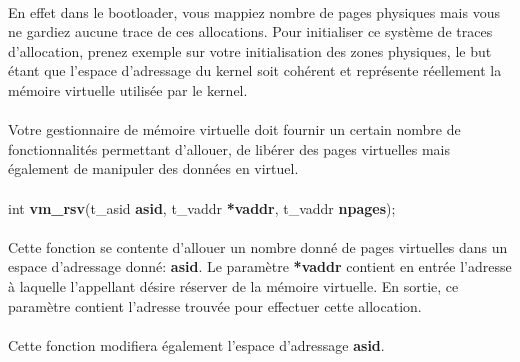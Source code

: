 \documentclass[10pt,a4wide]{article}
\begin{document}
\paragraph{}

En effet dans le bootloader, vous mappiez nombre de pages physiques
mais vous ne gardiez aucune trace de ces allocations. Pour initialiser
ce syst\`eme de traces d'allocation, prenez exemple sur votre
initialisation des zones physiques, le but \'etant que l'espace
d'adressage du kernel soit coh\'erent et repr\'esente r\'eellement
la m\'emoire virtuelle utilis\'ee par le kernel.

\paragraph{}

Votre gestionnaire de m\'emoire virtuelle doit fournir un certain nombre
de fonctionnalit\'es permettant d'allouer, de lib\'erer des pages
virtuelles mais \'egalement de manipuler des donn\'ees en virtuel.

\paragraph{}

\hspace{1.5cm}int \textbf{vm\_rsv}(t\_asid \textbf{asid},
                                   t\_vaddr \textbf{*vaddr},
                                   t\_vaddr \textbf{npages});

\paragraph{}

Cette fonction se contente d'allouer un nombre donn\'e de pages virtuelles
dans un espace d'adressage donn\'e: \textbf{asid}. Le param\`etre
\textbf{*vaddr} contient en entr\'ee l'adresse \`a laquelle l'appellant
d\'esire r\'eserver de la m\'emoire virtuelle. En sortie, ce param\`etre
contient l'adresse trouv\'ee pour effectuer cette allocation.

\paragraph{}

Cette fonction modifiera \'egalement l'espace d'adressage \textbf{asid}.

\paragraph{}
\end{document}
